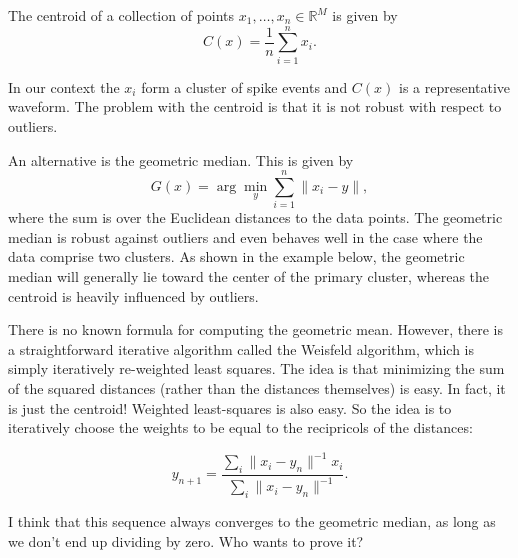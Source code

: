 \documentclass{article}
\begin{document}
The centroid of a collection of points $x_1,\dots,x_n\in \mathbb{R}^M$ is given by
$$C(x)=\frac{1}{n}\sum_{i=1}^n x_i.$$

In our context the $x_i$ form a cluster of spike events and $C(x)$ is a representative waveform. The problem with the centroid is that it is not robust with respect to outliers.

An alternative is the geometric median. This is given by
$$G(x)=\arg \min_y \sum_{i=1}^n\|x_i-y\|,$$
where the sum is over the Euclidean distances to the data points. The geometric median is robust against outliers and even behaves well in the case where the data comprise two clusters. As shown in the example below, the geometric median will generally lie toward the center of the primary cluster, whereas the centroid is heavily influenced by outliers.

There is no known formula for computing the geometric mean. However, there is a straightforward iterative algorithm called the Weisfeld algorithm, which is simply iteratively re-weighted least squares. The idea is that minimizing the sum of the squared distances (rather than the distances themselves) is easy. In fact, it is just the centroid! Weighted least-squares is also easy. So the idea is to iteratively choose the weights to be equal to the recipricols of the distances:

$$y_{n+1}=\frac{\sum_i \|x_i-y_n\|^{-1}x_i}{\sum_i \|x_i-y_n\|^{-1}}.$$

I think that this sequence always converges to the geometric median, as long as we don't end up dividing by zero. Who wants to prove it?
\end{document}
